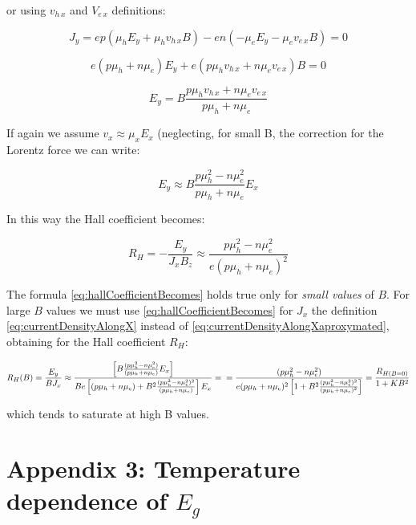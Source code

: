 \documentclass[]{book}
\begin{document}
or using \(v_{h \, x}\) and \(V_{e \, x}\) definitions:

\[J_y = ep ( \mu_h E_y + \mu_h v_{h \, x} B) - en( -\mu_e E_y - \mu_e v_{e \, x}B) = 0\]

\[e(p \mu_h + n \mu_e) E_y + e(p \mu_h v_{h \, x} + n \mu_e v_{e \, x}) B = 0\]

\[E_y = B \frac {p \mu_h v_{h \, x} + n \mu_e v_{e \, x}}{p \mu_h + n \mu_e}\]

If again we assume \(v_x \approx \mu_xE_x\) (neglecting, for small B,
the correction for the Lorentz force we can write:

\[E_y \approx B \frac{p \mu^2_h - n \mu^2_e}{p \mu_h + n \mu_e} E_x\]

In this way the Hall coefficient becomes:

\begin{equation}
R_H = - \frac{E_y}{J_x B_z} \approx \frac {p \mu^2_h - n \mu_e^2}{e (p \mu_h + n \mu_e )^2}
\label{eq:hallCoefficientBecomes}
\end{equation}

The formula \eqref{eq:hallCoefficientBecomes} holds true only for
\emph{small values} of \(B\). For large \(B\) values we must use
\eqref{eq:hallCoefficientBecomes} for \(J_x\) the definition
\eqref{eq:currentDensityAlongX} instead of
\eqref{eq:currentDensityAlongXaproxymated}, obtaining for the Hall
coefficient \(R_H\):

\begin{equation}
R_{ H }(B)=\frac { E_{ y } }{ BJ_{ x } } \approx \frac { \left[ B\frac { (p\mu ^{ 2 }_{ h }-n\mu ^{ 2 }_{ e }) }{ (p\mu _{ h }+n\mu _{ e }) } E_{ x } \right] }{ Be\left[ (p\mu _{ h }+n\mu _{ e })+B^{ 2 }\frac { (p\mu ^{ 2 }_{ h }-n\mu ^{ 2 }_{ e })^{ 2 } }{ (p\mu _{ h }+n\mu _{ e }) } \right] { E }_{ x } } = \\
=\frac { (p\mu ^{ 2 }_{ h }-n\mu ^{ 2 }_{ e }) }{ e(p\mu _{ h }+n\mu _{ e })^{ 2 }\left[ 1+B^{ 2 }\frac { (p{ \mu }_{ h }^{ 2 }-n\mu ^{ 2 }_{ e })^{ 2 } }{ (p\mu _{ h }+n\mu _{ e })^{ 2 } } \right] } =\frac { R_{ H(B=0) } }{ 1+KB^{ 2 } }
\label{eq:HallCoefficientBigEquation}
\end{equation}

which tends to saturate at high B values.

\clearpage

\chapter{\texorpdfstring{Appendix 3: Temperature dependence of
\(E_g\)}{Appendix 3: Temperature dependence of E\_g}}\label{appendix-3-temperature-dependence-of-e_g}
\end{document}
